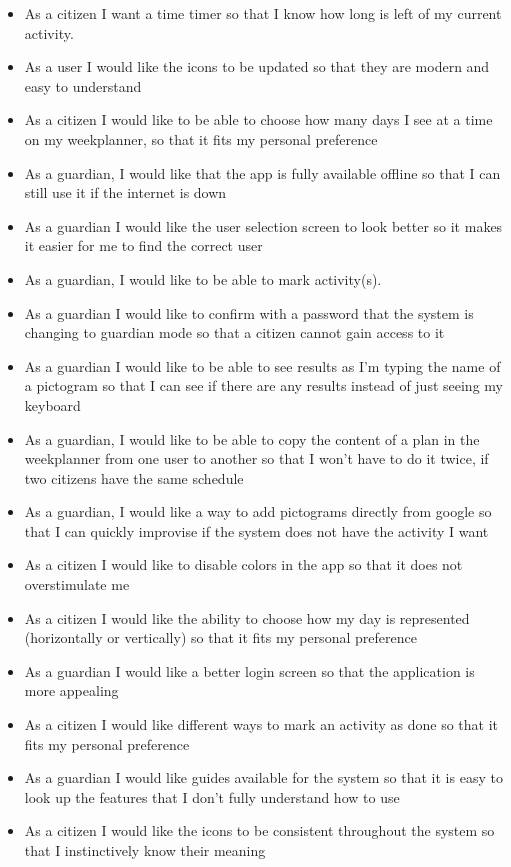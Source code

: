 \begin{itemize}
    \item As a citizen I want a time timer so that I know how long is left of my current activity.
    \item As a user I would like the icons to be updated so that they are modern and easy to understand
    \item As a citizen I would like to be able to choose how many days I see at a time on my weekplanner, so that it fits my personal preference
    \item As a guardian, I would like that the app is fully available offline so that I can still use it if the internet is down 
    \item As a guardian I would like the user selection screen to look better so it makes it easier for me to find the correct user 
    \item As a guardian, I would like to be able to mark activity(s).
    \item As a guardian I would like to confirm with a password that the system is changing to guardian mode so that a citizen cannot gain access to it 
    \item As a guardian I would like to be able to see results as I'm typing the name of a pictogram so that I can see if there are any results instead of just seeing my keyboard
    \item As a guardian, I would like to be able to copy the content of a plan in the weekplanner from one user to another so that I won't have to do it twice, if two citizens have the same schedule
    \item As a guardian, I would like a way to add pictograms directly from google so that I can quickly improvise if the system does not have the activity I want 
    \item As a citizen I would like to disable colors in the app so that it does not overstimulate me
    \item As a citizen I would like the ability to choose how my day is represented (horizontally or vertically) so that it fits my personal preference 
    \item As a guardian I would like a better login screen so that the application is more appealing
    \item As a citizen I would like different ways to mark an activity as done so that it fits my personal preference
    \item As a guardian I would like guides available for the system so that it is easy to look up the features that I don't fully understand how to use 
    \item As a citizen I would like the icons to be consistent throughout the system so that I instinctively know their meaning 
\end{itemize}

